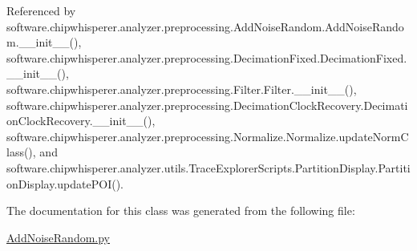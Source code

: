 Referenced by software.\+chipwhisperer.\+analyzer.\+preprocessing.\+Add\+Noise\+Random.\+Add\+Noise\+Random.\+\_\+\+\_\+init\+\_\+\+\_\+(), software.\+chipwhisperer.\+analyzer.\+preprocessing.\+Decimation\+Fixed.\+Decimation\+Fixed.\+\_\+\+\_\+init\+\_\+\+\_\+(), software.\+chipwhisperer.\+analyzer.\+preprocessing.\+Filter.\+Filter.\+\_\+\+\_\+init\+\_\+\+\_\+(), software.\+chipwhisperer.\+analyzer.\+preprocessing.\+Decimation\+Clock\+Recovery.\+Decimation\+Clock\+Recovery.\+\_\+\+\_\+init\+\_\+\+\_\+(), software.\+chipwhisperer.\+analyzer.\+preprocessing.\+Normalize.\+Normalize.\+update\+Norm\+Class(), and software.\+chipwhisperer.\+analyzer.\+utils.\+Trace\+Explorer\+Scripts.\+Partition\+Display.\+Partition\+Display.\+update\+P\+O\+I().




The documentation for this class was generated from the following file\+:\begin{DoxyCompactItemize}
\item 
\hyperlink{AddNoiseRandom_8py}{Add\+Noise\+Random.\+py}\end{DoxyCompactItemize}
